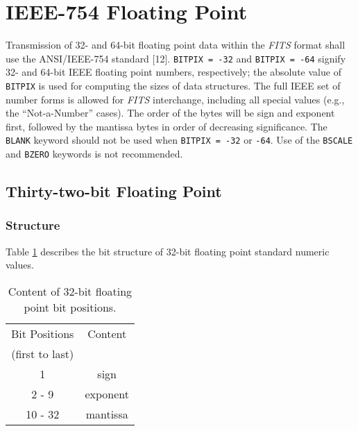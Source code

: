   \section{IEEE-754 Floating Point}
    Transmission of 32- and 64-bit floating
    point data within the {\em FITS\/} 
    format shall use the ANSI/IEEE-754 standard [12].
    {\tt BITPIX = -32} and 
    {\tt BITPIX = -64} signify 32- and 64-bit IEEE floating 
    point
    numbers, respectively; the absolute value of {\tt BITPIX} 
    is
    used for computing the sizes of data structures. The full 
    IEEE set of number forms is allowed for {\em FITS\/} 
    interchange, including all special
    values (e.g., the ``Not-a-Number'' 
    cases).
    The order of the bytes will be
    sign and exponent first,
    followed by the mantissa bytes in order of decreasing significance.  
    The {\tt BLANK} keyword
    should not be used when {\tt BITPIX = -32} or
    {\tt -64}.  Use of the {\tt BSCALE} and {\tt BZERO}
    keywords is not recommended. 

   \subsection{Thirty-two-bit Floating Point}
  
   \subsubsection{Structure}
    Table \ref{t:s32} describes the bit structure of 32-bit floating point
    standard numeric values.

    \begin{table}[htpb]  
      \begin{center}
        \begin{tabular}{cc}  \\
            Bit Positions   &  Content     \\ 
            (first to last) &              \\ \hline
                       1    &   sign       \\                     
                   2 - 9    &   exponent   \\
                  10 - 32   &   mantissa   \\
         \end{tabular}
      \end{center}
      \caption{Content of 32-bit floating point bit positions.}
      \label{t:s32}
    \end{table}
  
